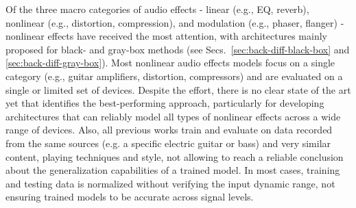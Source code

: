 Of the three macro categories of audio effects - linear (e.g., EQ, reverb), nonlinear (e.g., distortion, compression), and modulation (e.g., phaser, flanger) - nonlinear effects have received the most attention, with architectures mainly proposed for black- and gray-box methods (see Secs.~\ref{sec:back-diff-black-box} and \ref{sec:back-diff-gray-box}).
Most nonlinear audio effects models focus on a single category (e.g., guitar amplifiers, distortion, compressors) and are evaluated on a single or limited set of devices.
Despite the effort, there is no clear state of the art yet that identifies the best-performing approach, particularly for developing architectures that can reliably model all types of nonlinear effects across a wide range of devices.
Also, all previous works train and evaluate on data recorded from the same sources (e.g. a specific electric guitar or bass) and very similar content, playing techniques and style, not allowing to reach a reliable conclusion about the generalization capabilities of a trained model.
In most cases, training and testing data is normalized without verifying the input dynamic range, not ensuring trained models to be accurate across signal levels.

